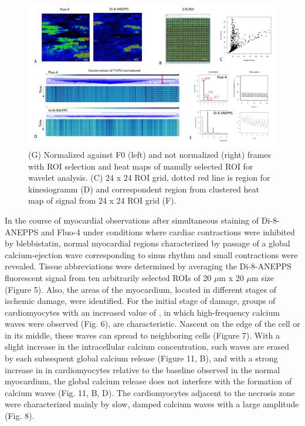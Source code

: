 \documentclass{biophys-new}
\begin{document}
\begin{figure}
    \includegraphics[width=0.9\linewidth]{fig5.png}
    \caption{(G) Normalized against F0 (left) and not normalized (right) frames with ROI selection and heat maps of manully selected ROI for wavelet analysis. (C) 24 x 24 ROI grid, dotted red line is region for kinesiogramm (D) and correspondent region from clustered heat map of signal from 24 x 24 ROI grid (F).}
    \label{fig:fig5}
\end{figure}


In the course of myocardial observations after simultaneous staining of Di-8-ANEPPS and Fluo-4 under conditions where cardiac contractions were inhibited by blebbistatin, normal myocardial regions characterized by passage of a global calcium-ejection wave corresponding to sinus rhythm and small contractions were revealed. Tissue abbreviations were determined by averaging the Di-8-ANEPPS fluorescent signal from ten arbitrarily selected ROIs of 20 $\mu$m x 20 $\mu$m size (Figure 5). Also, the areas of the myocardium, located in different stages of ischemic damage, were identified. For the initial stage of damage, groups of cardiomyocytes with an increased value of , in which high-frequency calcium waves were observed (Fig. 6), are characteristic. Nascent on the edge of the cell or in its middle, these waves can spread to neighboring cells (Figure 7). With a slight increase in the intracellular calcium concentration, such waves are erased by each subsequent global calcium release (Figure 11, B), and with a strong increase in  in cardiomyocytes relative to the baseline observed in the normal myocardium, the global calcium release does not interfere with the formation of calcium waves (Fig. 11, B, D). The cardiomyocytes adjacent to the necrosis zone were characterized mainly by slow, damped calcium waves with a large amplitude (Fig. 8).
\end{document}
